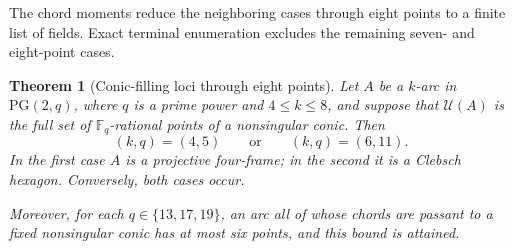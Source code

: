 \documentclass[11pt]{article}
\newtheorem{theorem}{Theorem}[section]
\theoremstyle{remark}
\newcommand{\PG}{\mathrm{PG}}
\newcommand{\F}{\mathbb{F}}
\newcommand{\cU}{\mathcal{U}}
\begin{document}
The chord moments reduce the neighboring cases through eight points to a
finite list of fields. Exact terminal enumeration excludes the remaining
seven- and eight-point cases.

\begin{theorem}[Conic-filling loci through eight points]
\label{thm:small-k-conic-filling}
Let $A$ be a $k$-arc in $\PG(2,q)$, where $q$ is a prime power and
$4\le k\le8$, and suppose that $\cU(A)$ is the full set of
$\F_q$-rational points of a nonsingular conic. Then
\[
 (k,q)=(4,5)\qquad\text{or}\qquad(k,q)=(6,11).
\]
In the first case $A$ is a projective four-frame; in the second it is a
Clebsch hexagon. Conversely, both cases occur.

Moreover, for each $q\in\{13,17,19\}$, an arc all of whose chords are
passant to a fixed nonsingular conic has at most six points, and this bound
is attained.
\end{theorem}
\end{document}
